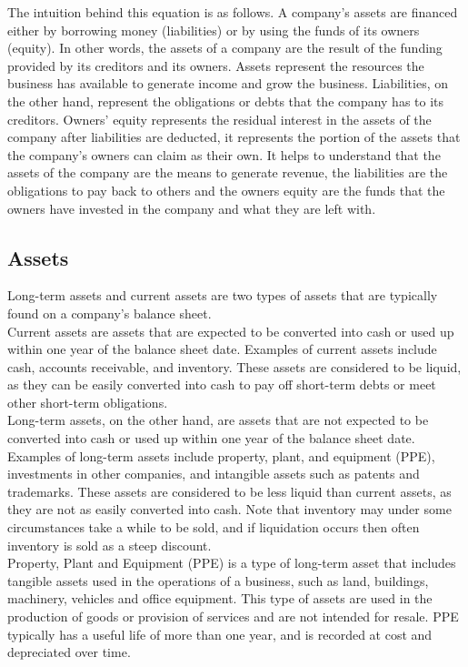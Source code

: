 \documentclass{article}
\begin{document}
The intuition behind this equation is as follows. A company's assets are financed either by borrowing money (liabilities) or by using the funds of its owners (equity). In other words, the assets of a company are the result of the funding provided by its creditors and its owners. Assets represent the resources the business has available to generate income and grow the business. Liabilities, on the other hand, represent the obligations or debts that the company has to its creditors. Owners' equity represents the residual interest in the assets of the company after liabilities are deducted, it represents the portion of the assets that the company's owners can claim as their own. It helps to understand that the assets of the company are the means to generate revenue, the liabilities are the obligations to pay back to others and the owners equity are the funds that the owners have invested in the company and what they are left with.

\subsection{Assets}

Long-term assets and current assets are two types of assets that are typically found on a company's balance sheet.\\

Current assets are assets that are expected to be converted into cash or used up within one year of the balance sheet date. Examples of current assets include cash, accounts receivable, and inventory. These assets are considered to be liquid, as they can be easily converted into cash to pay off short-term debts or meet other short-term obligations.\\

Long-term assets, on the other hand, are assets that are not expected to be converted into cash or used up within one year of the balance sheet date. Examples of long-term assets include property, plant, and equipment (PPE), investments in other companies, and intangible assets such as patents and trademarks. These assets are considered to be less liquid than current assets, as they are not as easily converted into cash. Note that inventory may under some circumstances take a while to be sold, and if liquidation occurs then often inventory is sold as a steep discount. \\

Property, Plant and Equipment (PPE) is a type of long-term asset that includes tangible assets used in the operations of a business, such as land, buildings, machinery, vehicles and office equipment. This type of assets are used in the production of goods or provision of services and are not intended for resale. PPE typically has a useful life of more than one year, and is recorded at cost and depreciated over time.
\end{document}
